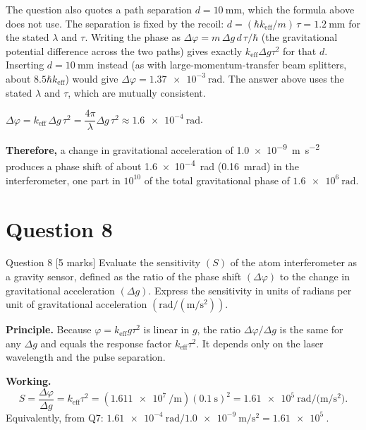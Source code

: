 \documentclass[11pt]{article}
\newcommand{\closing}[1]{\par\medskip\noindent\textbf{Therefore,} #1}
\begin{document}
\begin{notebox}
The question also quotes a path separation $d=\SI{10}{\milli\metre}$, which the formula above does
not use. The separation is fixed by the recoil: $d = (\hbar k_{\mathrm{eff}}/m)\,\tau = \SI{1.2}{\milli\metre}$
for the stated $\lambda$ and $\tau$. Writing the phase as $\Delta\varphi = m\,\Delta g\,d\,\tau/\hbar$
(the gravitational potential difference across the two paths) gives exactly $k_{\mathrm{eff}}\Delta g\tau^2$ for
that $d$. Inserting $d=\SI{10}{\milli\metre}$ instead (as with large-momentum-transfer beam splitters,
about $8.5\hbar k_{\mathrm{eff}}$) would give $\Delta\varphi = \SI{1.37e-3}{\radian}$. The answer
above uses the stated $\lambda$ and $\tau$, which are mutually consistent.
\end{notebox}

\begin{answerbox}
$\Delta\varphi = k_{\mathrm{eff}}\,\Delta g\,\tau^2 = \dfrac{4\pi}{\lambda}\Delta g\,\tau^2 \approx \SI{1.6e-4}{\radian}$.
\closing{a change in gravitational acceleration of \SI{1.0e-9}{\metre\per\second\squared} produces a
phase shift of about \SI{1.6e-4}{\radian} (\SI{0.16}{\milli\radian}) in the interferometer, one part in
$10^{10}$ of the total gravitational phase of $\SI{1.6e6}{\radian}$.}
\end{answerbox}

\section{Question 8}

\begin{problembox}{Question 8 \hfill [5 marks]}
Evaluate the sensitivity $(S)$ of the atom interferometer as a gravity sensor, defined as the ratio
of the phase shift $(\Delta\varphi)$ to the change in gravitational acceleration $(\Delta g)$. Express
the sensitivity in units of radians per unit of gravitational acceleration
$(\mathrm{rad}/(\mathrm{m}/\mathrm{s}^{2}))$.
\end{problembox}

\textbf{Principle.} Because $\varphi = k_{\mathrm{eff}}g\tau^2$ is linear in $g$, the ratio
$\Delta\varphi/\Delta g$ is the same for any $\Delta g$ and equals the response factor
$k_{\mathrm{eff}}\tau^2$. It depends only on the laser wavelength and the pulse separation.

\textbf{Working.}
\[
S = \frac{\Delta\varphi}{\Delta g} = k_{\mathrm{eff}}\tau^2
= (\SI{1.611e7}{\per\metre})(\SI{0.1}{\second})^2
= \SI{1.61e5}{\radian\per(\metre\per\second\squared)} .
\]
Equivalently, from Q7: $\SI{1.61e-4}{\radian}/\SI{1.0e-9}{\metre\per\second\squared} = \SI{1.61e5}{}$.
\end{document}
